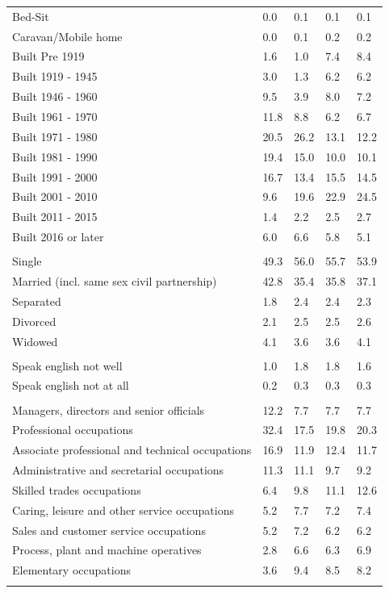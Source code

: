 \documentclass{article}
\begin{document}
\begin{table}[h]
\begin{tabular}{KTTTT}
Bed-Sit & 0.0& 0.1& 0.1& 0.1\\
Caravan/Mobile home & 0.0& 0.1& 0.2& 0.2\\
    \hline
Built Pre 1919 & 1.6& 1.0& 7.4& 8.4\\
Built 1919 - 1945 & 3.0& 1.3& 6.2& 6.2\\
Built  1946 - 1960 & 9.5& 3.9& 8.0& 7.2\\
Built  1961 - 1970 & 11.8&  8.8&  6.2&  6.7\\
Built  1971 - 1980 & 20.5& 26.2& 13.1& 12.2\\
Built  1981 - 1990 & 19.4& 15.0& 10.0& 10.1\\
Built  1991 - 2000 & 16.7& 13.4& 15.5& 14.5\\
Built  2001 - 2010 &  9.6& 19.6& 22.9& 24.5\\
Built  2011 - 2015 & 1.4& 2.2& 2.5& 2.7\\
Built  2016 or later & 6.0& 6.6& 5.8& 5.1\\
\hline
    \\
    \hline
Single & 49.3& 56.0& 55.7& 53.9\\
Married (incl. same sex civil partnership) & 42.8& 35.4& 35.8& 37.1\\
Separated  & 1.8& 2.4& 2.4& 2.3\\
Divorced  & 2.1& 2.5& 2.5& 2.6\\
Widowed & 4.1& 3.6& 3.6& 4.1\\
\hline
    \\ 
    \hline
Speak english not well & 1.0& 1.8& 1.8& 1.6\\
Speak english not at all & 0.2& 0.3& 0.3& 0.3\\
\hline
    \\
    \hline
Managers, directors and senior officials & 12.2&  7.7&  7.7&  7.7\\
Professional occupations & 32.4& 17.5& 19.8& 20.3\\
Associate professional and technical occupations & 16.9& 11.9& 12.4& 11.7\\
Administrative and secretarial occupations & 11.3& 11.1&  9.7&  9.2\\
Skilled trades occupations &  6.4&  9.8& 11.1& 12.6\\
Caring, leisure and other service occupations & 5.2& 7.7& 7.2& 7.4\\
Sales and customer service occupations & 5.2& 7.2& 6.2& 6.2\\
Process, plant and machine operatives & 2.8& 6.6& 6.3& 6.9\\
Elementary occupations & 3.6& 9.4& 8.5& 8.2\\
\hline
\end{tabular}
\end{table}
\end{document}

